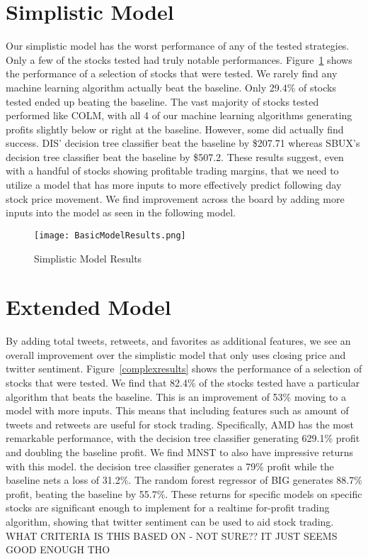 \documentclass[../thesis.tex]{subfiles}
\begin{document}
\section{Simplistic Model}
Our simplistic model has the worst performance of any of the tested strategies. Only a few of the stocks tested had truly notable performances. Figure~\ref{simpleresults} shows the performance of a selection of stocks that were tested. We rarely find any machine learning algorithm actually beat the baseline. Only 29.4\% of stocks tested ended up beating the baseline. The vast majority of stocks tested performed like COLM, with all 4 of our machine learning algorithms generating profits slightly below or right at the baseline. However, some did actually find success. DIS' decision tree classifier beat the baseline by \$207.71 whereas SBUX's decision tree classifier beat the baseline by \$507.2. These results suggest, even with a handful of stocks showing profitable trading margins, that we need to utilize a model that has more inputs to more effectively predict following day stock price movement. We find improvement across the board by adding more inputs into the model as seen in the following model. 

\begin{figure}[h]
\centering
\texttt{[image: BasicModelResults.png]}
\caption{Simplistic Model Results \label{overflow}}
\label{simpleresults}
\end{figure}

\section{Extended Model}
By adding total tweets, retweets, and favorites as additional features, we see an overall improvement over the simplistic model that only uses closing price and twitter sentiment. Figure~\ref{complexresults} shows the performance of a selection of stocks that were tested. We find that 82.4\% of the stocks tested have a particular algorithm that beats the baseline. This is an improvement of 53\% moving to a model with more inputs. This means that including features such as amount of tweets and retweets are useful for stock trading. Specifically, AMD has the most remarkable performance, with the decision tree classifier generating 629.1\% profit and doubling the baseline profit. We find MNST to also have impressive returns with this model. the decision tree classifier generates a 79\% profit while the baseline nets a loss of 31.2\%. The random forest regressor of BIG generates 88.7\% profit, beating the baseline by 55.7\%. These returns for specific models on specific stocks are significant enough to implement for a realtime for-profit trading algorithm, showing that twitter sentiment can be used to aid stock trading. WHAT CRITERIA IS THIS BASED ON - NOT SURE?? IT JUST SEEMS GOOD ENOUGH THO
\end{document}
